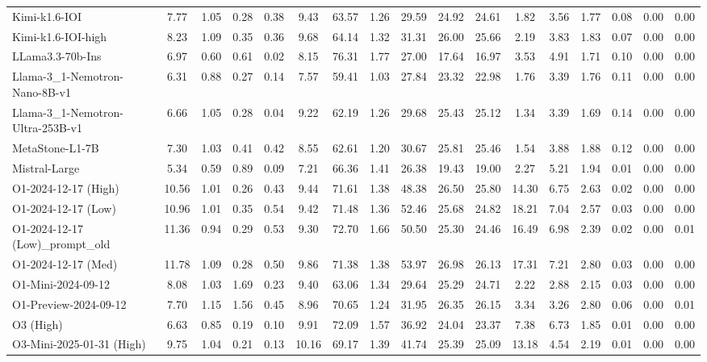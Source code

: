 \begin{table}[t]
{\begin{tabular}{|l|cccc|cc|cccccc|ccc|c|}
Kimi-k1.6-IOI & 7.77 & 1.05 & 0.28 & 0.38 & 9.43 & 63.57 & 1.26 & 29.59 & 24.92 & 24.61 & 1.82 & 3.56 & 1.77 & 0.08 & 0.00 & 0.00 \\
Kimi-k1.6-IOI-high & 8.23 & 1.09 & 0.35 & 0.36 & 9.68 & 64.14 & 1.32 & 31.31 & 26.00 & 25.66 & 2.19 & 3.83 & 1.83 & 0.07 & 0.00 & 0.00 \\
LLama3.3-70b-Ins & 6.97 & 0.60 & 0.61 & 0.02 & 8.15 & 76.31 & 1.77 & 27.00 & 17.64 & 16.97 & 3.53 & 4.91 & 1.71 & 0.10 & 0.00 & 0.00 \\
Llama-3\_1-Nemotron-Nano-8B-v1 & 6.31 & 0.88 & 0.27 & 0.14 & 7.57 & 59.41 & 1.03 & 27.84 & 23.32 & 22.98 & 1.76 & 3.39 & 1.76 & 0.11 & 0.00 & 0.00 \\
Llama-3\_1-Nemotron-Ultra-253B-v1 & 6.66 & 1.05 & 0.28 & 0.04 & 9.22 & 62.19 & 1.26 & 29.68 & 25.43 & 25.12 & 1.34 & 3.39 & 1.69 & 0.14 & 0.00 & 0.00 \\
MetaStone-L1-7B & 7.30 & 1.03 & 0.41 & 0.42 & 8.55 & 62.61 & 1.20 & 30.67 & 25.81 & 25.46 & 1.54 & 3.88 & 1.88 & 0.12 & 0.00 & 0.00 \\
Mistral-Large & 5.34 & 0.59 & 0.89 & 0.09 & 7.21 & 66.36 & 1.41 & 26.38 & 19.43 & 19.00 & 2.27 & 5.21 & 1.94 & 0.01 & 0.00 & 0.00 \\
O1-2024-12-17 (High) & 10.56 & 1.01 & 0.26 & 0.43 & 9.44 & 71.61 & 1.38 & 48.38 & 26.50 & 25.80 & 14.30 & 6.75 & 2.63 & 0.02 & 0.00 & 0.00 \\
O1-2024-12-17 (Low) & 10.96 & 1.01 & 0.35 & 0.54 & 9.42 & 71.48 & 1.36 & 52.46 & 25.68 & 24.82 & 18.21 & 7.04 & 2.57 & 0.03 & 0.00 & 0.00 \\
O1-2024-12-17 (Low)\_prompt\_old & 11.36 & 0.94 & 0.29 & 0.53 & 9.30 & 72.70 & 1.66 & 50.50 & 25.30 & 24.46 & 16.49 & 6.98 & 2.39 & 0.02 & 0.00 & 0.01 \\
O1-2024-12-17 (Med) & 11.78 & 1.09 & 0.28 & 0.50 & 9.86 & 71.38 & 1.38 & 53.97 & 26.98 & 26.13 & 17.31 & 7.21 & 2.80 & 0.03 & 0.00 & 0.00 \\
O1-Mini-2024-09-12 & 8.08 & 1.03 & 1.69 & 0.23 & 9.40 & 63.06 & 1.34 & 29.64 & 25.29 & 24.71 & 2.22 & 2.88 & 2.15 & 0.03 & 0.00 & 0.00 \\
O1-Preview-2024-09-12 & 7.70 & 1.15 & 1.56 & 0.45 & 8.96 & 70.65 & 1.24 & 31.95 & 26.35 & 26.15 & 3.34 & 3.26 & 2.80 & 0.06 & 0.00 & 0.01 \\
O3 (High) & 6.63 & 0.85 & 0.19 & 0.10 & 9.91 & 72.09 & 1.57 & 36.92 & 24.04 & 23.37 & 7.38 & 6.73 & 1.85 & 0.01 & 0.00 & 0.00 \\
O3-Mini-2025-01-31 (High) & 9.75 & 1.04 & 0.21 & 0.13 & 10.16 & 69.17 & 1.39 & 41.74 & 25.39 & 25.09 & 13.18 & 4.54 & 2.19 & 0.01 & 0.00 & 0.00 \\

\end{tabular}}
\end{table}
